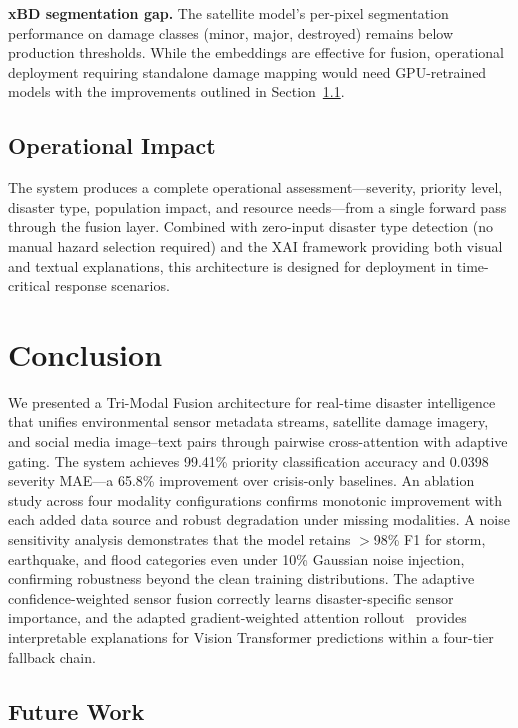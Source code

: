\documentclass[journal]{IEEEtran}
\begin{document}
\textbf{xBD segmentation gap.} The satellite model's per-pixel segmentation performance on damage classes (minor, major, destroyed) remains below production thresholds. While the embeddings are effective for fusion, operational deployment requiring standalone damage mapping would need GPU-retrained models with the improvements outlined in Section~\ref{sec:future}.

\subsection{Operational Impact}

The system produces a complete operational assessment---severity, priority level, disaster type, population impact, and resource needs---from a single forward pass through the fusion layer. Combined with zero-input disaster type detection (no manual hazard selection required) and the XAI framework providing both visual and textual explanations, this architecture is designed for deployment in time-critical response scenarios.

\section{Conclusion}

We presented a Tri-Modal Fusion architecture for real-time disaster intelligence that unifies environmental sensor metadata streams, satellite damage imagery, and social media image--text pairs through pairwise cross-attention with adaptive gating. The system achieves 99.41\% priority classification accuracy and 0.0398 severity MAE---a 65.8\% improvement over crisis-only baselines. An ablation study across four modality configurations confirms monotonic improvement with each added data source and robust degradation under missing modalities. A noise sensitivity analysis demonstrates that the model retains $>$98\% F1 for storm, earthquake, and flood categories even under 10\% Gaussian noise injection, confirming robustness beyond the clean training distributions. The adaptive confidence-weighted sensor fusion correctly learns disaster-specific sensor importance, and the adapted gradient-weighted attention rollout~\cite{chefer2021transformer} provides interpretable explanations for Vision Transformer predictions within a four-tier fallback chain.

\subsection{Future Work}
\label{sec:future}
\end{document}
